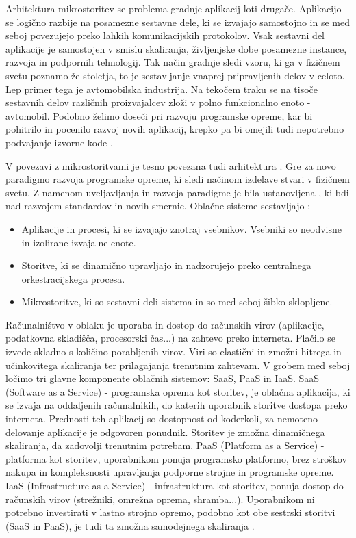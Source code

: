 \documentclass[a4paper, 12pt]{book}
\begin{document}
Arhitektura mikrostoritev se problema gradnje aplikacij loti drugače.
Aplikacijo se logično razbije na posamezne sestavne dele, ki se izvajajo samostojno in se med seboj povezujejo preko lahkih komunikacijskih protokolov.
Vsak sestavni del aplikacije je samostojen v smislu skaliranja, življenjske dobe posamezne instance, razvoja in podpornih tehnologij.
Tak način gradnje sledi vzoru, ki ga v fizičnem svetu poznamo že stoletja, to je sestavljanje vnaprej pripravljenih delov v celoto.
Lep primer tega je avtomobilska industrija.
Na tekočem traku se na tisoče sestavnih delov različnih proizvajalcev zloži v polno funkcionalno enoto - avtomobil.
Podobno želimo doseči pri razvoju programske opreme, kar bi pohitrilo in pocenilo razvoj novih aplikacij, krepko pa bi omejili tudi nepotrebno podvajanje izvorne kode \cite{microservicePattern, microservicesMartin}.

V povezavi z mikrostoritvami je tesno povezana tudi arhitektura .
Gre za novo paradigmo razvoja programske opreme, ki sledi načinom izdelave stvari v fizičnem svetu.
Z namenom uveljavljanja in razvoja paradigme je bila ustanovljena , ki bdi nad razvojem standardov in novih smernic.
Oblačne sisteme sestavljajo \cite{cncf}:
\begin{itemize}
	\item Aplikacije in procesi, ki se izvajajo znotraj vsebnikov. Vsebniki so neodvisne in izolirane izvajalne enote.
	\item Storitve, ki se dinamično upravljajo in nadzorujejo preko centralnega orkestracijskega procesa.
	\item Mikrostoritve, ki so sestavni deli sistema in so med seboj šibko sklopljene.
\end{itemize}

Računalništvo v oblaku je uporaba in dostop do računskih virov (aplikacije, podatkovna skladišča, procesorski čas...) na zahtevo preko interneta.
Plačilo se izvede skladno s količino porabljenih virov.
Viri so elastični in zmožni hitrega in učinkovitega skaliranja ter prilagajanja trenutnim zahtevam.
V grobem med seboj ločimo tri glavne komponente oblačnih sistemov: SaaS, PaaS in IaaS.
SaaS (Software as a Service) - programska oprema kot storitev, je oblačna aplikacija, ki se izvaja na oddaljenih računalnikih, do katerih uporabnik storitve dostopa preko interneta. 
Prednosti teh aplikacij so dostopnost od koderkoli, za nemoteno delovanje aplikacije je odgovoren ponudnik.
Storitev je zmožna dinamičnega skaliranja, da zadovolji trenutnim potrebam.
PaaS (Platform as a Service) - platforma kot storitev, uporabnikom ponuja programsko platformo, brez stroškov nakupa in kompleksnosti upravljanja podporne strojne in programske opreme.
IaaS (Infrastructure as a Service) - infrastruktura kot storitev, ponuja dostop do računskih virov (strežniki, omrežna oprema, shramba...).
Uporabnikom ni potrebno investirati v lastno strojno opremo, podobno kot obe sestrski storitvi (SaaS in PaaS), je tudi ta zmožna samodejnega skaliranja \cite{ibmCloudComputing}.
\end{document}
